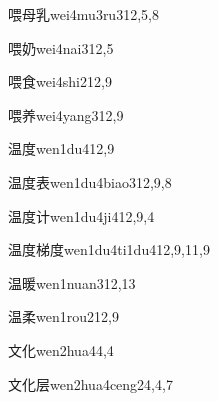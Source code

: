 \begin{verbete}{喂母乳}{wei4mu3ru3}{12,5,8}
\end{verbete}

\begin{verbete}{喂奶}{wei4nai3}{12,5}
\end{verbete}

\begin{verbete}{喂食}{wei4shi2}{12,9}
\end{verbete}

\begin{verbete}{喂养}{wei4yang3}{12,9}
\end{verbete}

\begin{verbete}{温度}{wen1du4}{12,9}
\end{verbete}

\begin{verbete}{温度表}{wen1du4biao3}{12,9,8}
\end{verbete}

\begin{verbete}{温度计}{wen1du4ji4}{12,9,4}
\end{verbete}

\begin{verbete}{温度梯度}{wen1du4ti1du4}{12,9,11,9}
\end{verbete}

\begin{verbete}{温暖}{wen1nuan3}{12,13}
\end{verbete}

\begin{verbete}{温柔}{wen1rou2}{12,9}
\end{verbete}

\begin{verbete}{文化}{wen2hua4}{4,4}
\end{verbete}

\begin{verbete}{文化层}{wen2hua4ceng2}{4,4,7}
\end{verbete}

